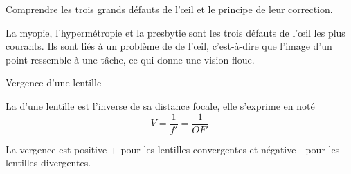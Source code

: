 \tetePremStssVisi
{}

\begin{objectifs}
  \item Comprendre les trois grands défauts de l'œil et le principe de leur correction.
\end{objectifs}

\begin{contexte}
  La myopie, l'hypermétropie et la presbytie sont les trois défauts de l'œil les plus courants.
  Ils sont liés à un problème de  de l'œil, c'est-à-dire que l'image d'un point ressemble à une tâche, ce qui donne une vision floue.
  
\end{contexte}

\begin{doc}{Vergence d'une lentille}
  \begin{importants}
    La  d'une lentille est l'inverse de sa distance focale, elle s'exprime en  noté \unit{\dioptre}
    \begin{equation*}  
      V = \dfrac{1}{f'} = \dfrac{1}{OF'}
    \end{equation*}
  \end{importants}

  La vergence est positive + pour les lentilles convergentes et négative - pour les lentilles divergentes.
\end{doc}

